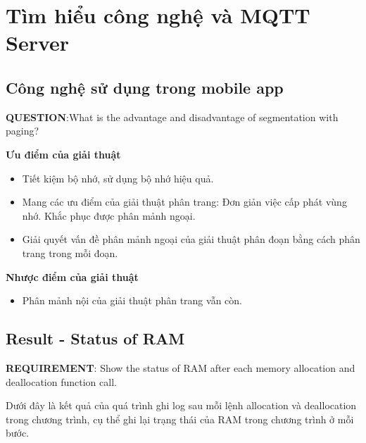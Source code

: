 
\section{Tìm hiểu công nghệ và MQTT Server}

\subsection{Công nghệ sử dụng trong mobile app}

\vspace{0.5cm}

\textbf{QUESTION}:What is the advantage and disadvantage of segmentation with paging?

\vspace{0.5cm}

\textbf{Ưu điểm của giải thuật}

\begin{itemize}
	\item Tiết kiệm bộ nhớ, sử dụng bộ nhớ hiệu quả.
	\item Mang các ưu điểm của giải thuật phân trang:
	\subitem Đơn giản việc cấp phát vùng nhớ.
	\subitem Khắc phục được phân mảnh ngoại.
	\item Giải quyết vấn đề phân mảnh ngoại của giải thuật phân đoạn bằng cách phân trang trong mỗi đoạn.
\end{itemize}

\vspace{0.2cm}

\textbf{Nhược điểm của giải thuật}

\begin{itemize}
	\item Phân mảnh nội của giải thuật phân trang vẫn còn.
\end{itemize}

\vspace{0.2cm}

\subsection{Result - Status of RAM}

\vspace{0.5cm}

\textbf{REQUIREMENT}: Show the status of RAM after each memory allocation and deallocation function call.

\vspace{0.5cm}


Dưới đây là kết quả của quá trình ghi log sau mỗi lệnh allocation và deallocation trong chương trình, cụ thể ghi lại trạng thái của RAM trong chương trình ở mỗi bước.


